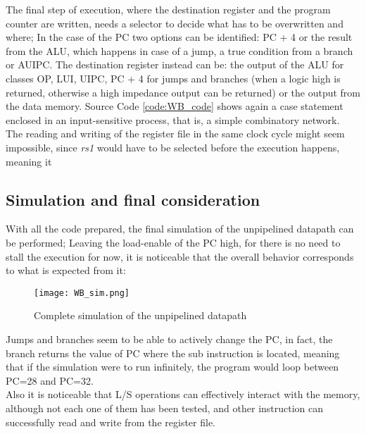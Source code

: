 The final step of execution, where the destination register and the program counter are written, needs a selector to decide what has to be overwritten and where; In the case of the PC two options can be identified: PC + 4 or the result from the ALU, which happens in case of a jump, a true condition from a branch or AUIPC. The destination register instead can be: the output of the ALU for classes OP, LUI, UIPC, PC + 4 for jumps and branches (when a logic high is returned, otherwise a high impedance output can be returned) or the output from the data memory. Source Code \ref{code:WB_code} shows again a case statement enclosed in an input-sensitive process, that is, a simple combinatory network.\\
The reading and writing of the register file in the same clock cycle might seem impossible, since \emph{rs1} would have to be selected before the execution happens, meaning it  

\subsection{Simulation and final consideration}
With all the code prepared, the final simulation of the unpipelined datapath can be performed; Leaving the load-enable of the PC high, for there is no need to stall the execution for now, it is noticeable that the overall behavior corresponds to what is expected from it:

\begin{figure}[!ht]
    \centering
    \texttt{[image: WB\_sim.png]}
    \caption{Complete simulation of the unpipelined datapath}
    \label{fig:WB_sim}
\end{figure}

Jumps and branches seem to be able to actively change the PC, in fact, the branch returns the value of PC where the sub instruction is located, meaning that if the simulation were to run infinitely, the program would loop between PC=28 and PC=32.\\ 
Also it is noticeable that L/S operations can effectively interact with the memory, although not each one of them has been tested, and other instruction can successfully read and write from the register file.